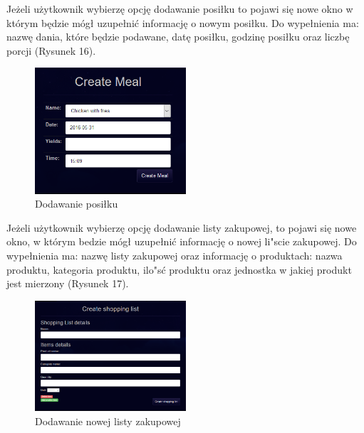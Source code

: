 \documentclass{article}
\begin{document}
\newpage
Jeżeli użytkownik wybierzę opcję dodawanie posiłku to pojawi się nowe okno w którym będzie mógł uzupełnić informację o nowym posiłku. Do wypełnienia ma: nazwę dania, które będzie podawane, datę posiłku, godzinę posiłku oraz liczbę porcji (Rysunek 16).
\begin{figure}[!ht]
  \centering
    \includegraphics[width=0.5\textwidth]{reshp7}\par\vspace{1cm}
  \caption{Dodawanie posiłku}
\end{figure}

Jeżeli użytkownik wybierzę opcję dodawanie listy zakupowej, to pojawi się nowe okno, w którym bedzie mógł uzupełnić informację o nowej li"scie zakupowej. Do wypełnienia ma: nazwę listy zakupowej oraz informację o produktach: nazwa produktu, kategoria produktu, ilo"sć produktu oraz jednostka w jakiej produkt jest mierzony (Rysunek 17). 
\begin{figure}[!ht]
  \centering
    \includegraphics[width=0.5\textwidth]{reshp8}\par\vspace{1cm}
  \caption{Dodawanie nowej listy zakupowej}
\end{figure}
\end{document}
